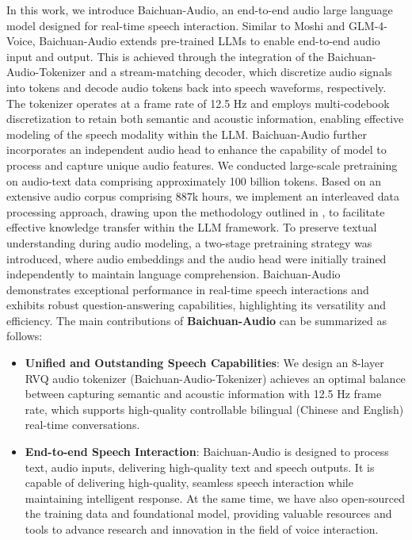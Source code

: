 In this work, we introduce Baichuan-Audio, an end-to-end audio large language model designed for real-time speech interaction. Similar to Moshi and GLM-4-Voice, Baichuan-Audio extends pre-trained LLMs to enable end-to-end audio input and output. This is achieved through the integration of the Baichuan-Audio-Tokenizer and a stream-matching decoder, which discretize audio signals into tokens and decode audio tokens back into speech waveforms, respectively. The tokenizer operates at a frame rate of 12.5 Hz and employs multi-codebook discretization to retain both semantic and acoustic information, enabling effective modeling of the speech modality within the LLM. Baichuan-Audio further incorporates an independent audio head to enhance the capability of model to process and capture unique audio features. We conducted large-scale pretraining on audio-text data comprising approximately 100 billion tokens. Based on an extensive audio corpus comprising 887k hours, we implement an interleaved data processing approach, drawing upon the methodology outlined in \cite{kim2024unified,nguyen2025spirit,zeng2024scaling}, to facilitate effective knowledge transfer within the LLM framework. To preserve textual understanding during audio modeling, a two-stage pretraining strategy was introduced, where audio embeddings and the audio head were initially trained independently to maintain language comprehension. Baichuan-Audio demonstrates exceptional performance in real-time speech interactions and exhibits robust question-answering capabilities, highlighting its versatility and efficiency.
The main contributions of \textbf{Baichuan-Audio} can be summarized as follows: 
\begin{itemize}

    \item \textbf{Unified and Outstanding Speech Capabilities}: We design an 8-layer RVQ audio tokenizer (Baichuan-Audio-Tokenizer) achieves an optimal balance between capturing semantic and acoustic information with 12.5 Hz frame rate, which supports high-quality controllable bilingual (Chinese and English) real-time conversations.

    \item \textbf{End-to-end Speech Interaction}: Baichuan-Audio is designed to process text, audio inputs, delivering high-quality text and speech outputs. It is capable of delivering high-quality, seamless speech interaction while maintaining intelligent response. At the same time, we have also open-sourced the training data and foundational model, providing valuable resources and tools to advance research and innovation in the field of voice interaction.
\end{itemize}

